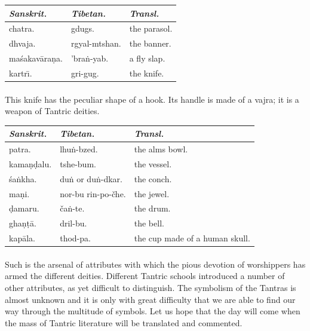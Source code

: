 \documentclass[a4paper, 12pt, oneside]{article}
\begin{document}
\begin{table}[H]
    \centering
    \bfseries
    \small
    \begin{tabular}{l l l}
           \emph{Sanskrit.}  &  \emph{Tibetan.}  &  \emph{Transl.}           \\ \hline
        chatra.        &  gdugs.         &  the parasol.  \\
         dhvaja.        &  rgyal-mtshan.  &  the banner.   \\
         ma\'{s}akav\={a}ra\d{n}a.  &  'bra\.{n}-yab.     &  a fly slap.   \\
         kartr\={\i}.        &  gri-gug.       &  the knife. \\
    \end{tabular}
\end{table}
\paragraph{}
This knife has the peculiar shape of a hook. Its handle is made of a vajra; it is a weapon of Tantric deities.

\begin{table}[H]
    \centering
    \bfseries
    \small
    \begin{tabular}{l l l}
           \emph{Sanskrit.}  &  \emph{Tibetan.}  &  \emph{Transl.}           \\ \hline
        patra.      &  lhu\.{n}-bzed.          &  the alms bowl.                  \\
         kama\d{n}\d{d}alu.  &  tshe-bum.           &  the vessel.                     \\
         \'{s}a\.{n}kha.     &  du\.{n} or du\.{n}-dkar.    &  the conch.                      \\
         ma\d{n}i.       &  nor-bu rin-po-čhe.  &  the jewel.                      \\
         \d{d}amaru.     &  ča\.{n}-te.             &  the drum.                       \\
         gha\d{n}\d{t}\={a}.     &  dril-bu.            &  the bell.                       \\
         kap\={a}la.     &  thod-pa.            &  the cup made of a human skull. \\
    \end{tabular}
\end{table}
\paragraph{}
Such is the arsenal of attributes with which the pious devotion of worshippers has armed the different deities. Different Tantric schools introduced a number of other attributes, as yet difficult to distinguish. The symbolism of the Tantras is almost unknown and it is only with great difficulty that we are able to find our way through the multitude of symbols. Let us hope that the day will come when the mass of Tantric literature will be translated and commented.
\end{document}
